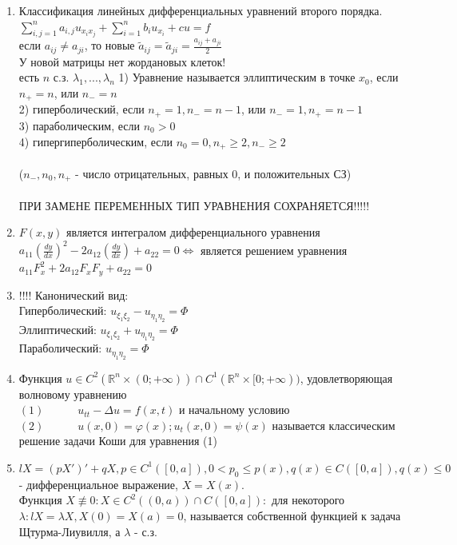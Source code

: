 \documentclass[a4paper,12pt]{article}
\newcommand {\FI} {\varphi}
\newcommand {\titt} {\Longleftrightarrow}
\newcommand {\LS} {\sum\limits}
\begin{document}
\begin{enumerate}
\item Классификация линейных дифференциальных уравнений второго порядка.\\
$\LS_{i,j = 1}^n a_{i,j} u_{x_i x_j} + \LS_{i=1}^n b_i u_{x_i} +cu = f$\\
если $a_{ij}\ne a_{ji}$, то новые $\widetilde{a}_{ij} = \widetilde{a}_{ji} = \frac{a_{ij} + a_{ji}}{2}$\\
У новой матрицы нет жордановых клеток!\\
есть $n$ с.з. $\lambda_1,...,\lambda_n$
1) Уравнение называется эллиптическим в точке $x_0$, если $n_+ = n$, или $n_- = n$\\
2) гиперболический, если $n_+ = 1, n_- = n-1$, или $n_- = 1, n_+ = n-1$\\
3) параболическим, если $n_0 > 0$\\
4) гипергиперболическим, если $n_0 = 0, n_+ \ge 2, n_- \ge 2$\\\\
($n_-, n_0, n_+$ - число отрицательных, равных 0, и положительных СЗ)\\\\ ПРИ ЗАМЕНЕ ПЕРЕМЕННЫХ ТИП УРАВНЕНИЯ СОХРАНЯЕТСЯ!!!!!\\
\item $F(x,y)$ является интегралом дифференциального уравнения $a_{11}\left(\frac{dy}{dx}\right)^2 -2a_{12}\left(\frac{dy}{dx}\right) +a_{22} = 0 \titt$ является решением уравнения $a_{11}F_x^2 + 2a_{12}F_xF_y + a_{22} = 0$\\
\item !!!! Канонический вид:\\
Гиперболический: $u_{\xi_1\xi_2} - u_{\eta_1\eta_2}= \Phi$\\
Эллиптический: $u_{\xi_1\xi_2} + u_{\eta_1\eta_2}= \Phi$\\
Параболический: $u_{\eta_1\eta_2}= \Phi$

\item Функция $u\in C^2(\mathbb{R}^n\times (0;+\infty))\cap C^1(\mathbb{R}^n\times [0;+\infty))$, удовлетворяющая волновому уравнению\\
$(1) \quad\quad \quad u_{tt} - \Delta u = f(x,t)$ и начальному условию \\$(2)\quad\quad \quad u(x,0)=\FI(x); u_t(x,0) = \psi(x)$ называется классическим решение задачи Коши для уравнения (1)


\item $lX = (pX')'+qX, p\in C^1([0,a]), 0 < p_0\le p(x), q(x) \in C([0,a]), q(x) \le 0$- дифференциальное выражение, $X = X(x)$.\\
Функция $X\not\equiv0: X\in C^2((0,a))\cap C([0,a]): $ для некоторого $\lambda: lX = \lambda X, X(0)=X(a) = 0$, называется собственной функцией к задача Щтурма-Лиувилля, а $\lambda$ - с.з.


\end{enumerate}
\end{document}
